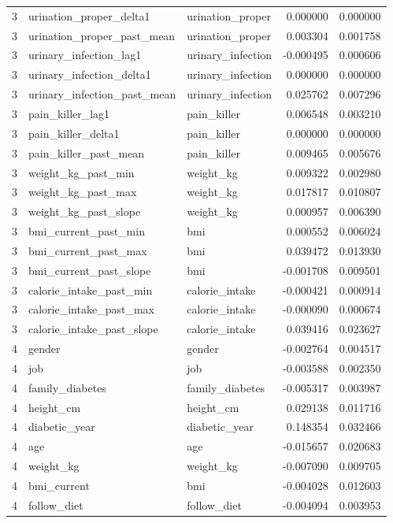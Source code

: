 \begin{longtable}{rllrr}
3 & urination\_proper\_delta1 & urination\_proper & 0.000000 & 0.000000 \\
3 & urination\_proper\_past\_mean & urination\_proper & 0.003304 & 0.001758 \\
3 & urinary\_infection\_lag1 & urinary\_infection & -0.000495 & 0.000606 \\
3 & urinary\_infection\_delta1 & urinary\_infection & 0.000000 & 0.000000 \\
3 & urinary\_infection\_past\_mean & urinary\_infection & 0.025762 & 0.007296 \\
3 & pain\_killer\_lag1 & pain\_killer & 0.006548 & 0.003210 \\
3 & pain\_killer\_delta1 & pain\_killer & 0.000000 & 0.000000 \\
3 & pain\_killer\_past\_mean & pain\_killer & 0.009465 & 0.005676 \\
3 & weight\_kg\_past\_min & weight\_kg & 0.009322 & 0.002980 \\
3 & weight\_kg\_past\_max & weight\_kg & 0.017817 & 0.010807 \\
3 & weight\_kg\_past\_slope & weight\_kg & 0.000957 & 0.006390 \\
3 & bmi\_current\_past\_min & bmi & 0.000552 & 0.006024 \\
3 & bmi\_current\_past\_max & bmi & 0.039472 & 0.013930 \\
3 & bmi\_current\_past\_slope & bmi & -0.001708 & 0.009501 \\
3 & calorie\_intake\_past\_min & calorie\_intake & -0.000421 & 0.000914 \\
3 & calorie\_intake\_past\_max & calorie\_intake & -0.000090 & 0.000674 \\
3 & calorie\_intake\_past\_slope & calorie\_intake & 0.039416 & 0.023627 \\
4 & gender & gender & -0.002764 & 0.004517 \\
4 & job & job & -0.003588 & 0.002350 \\
4 & family\_diabetes & family\_diabetes & -0.005317 & 0.003987 \\
4 & height\_cm & height\_cm & 0.029138 & 0.011716 \\
4 & diabetic\_year & diabetic\_year & 0.148354 & 0.032466 \\
4 & age & age & -0.015657 & 0.020683 \\
4 & weight\_kg & weight\_kg & -0.007090 & 0.009705 \\
4 & bmi\_current & bmi & -0.004028 & 0.012603 \\
4 & follow\_diet & follow\_diet & -0.004094 & 0.003953 \\

\end{longtable}
